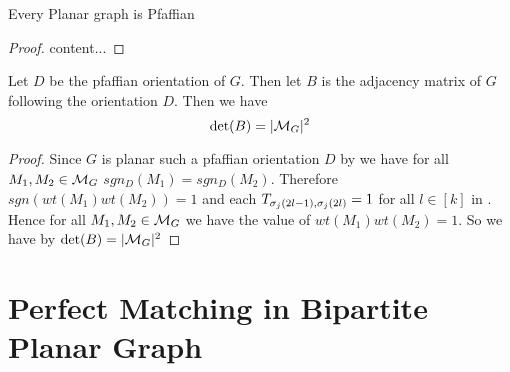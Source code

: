 \begin{theorem}
	Every Planar graph is Pfaffian 
\end{theorem}
\begin{proof}
	content...
\end{proof}
\begin{theorem}
	Let $D$ be the pfaffian orientation of $G$. Then let $B$ is the adjacency matrix of $G$ following the orientation $D$. Then we have $$\det(B)=|\mathcal{M}_G|^2$$
\end{theorem}
\begin{proof}
	Since $G$ is planar such a pfaffian orientation $D$ by  we have for all $M_1,M_2\in \mathcal{M}_G$ $sgn_D(M_1)=sgn_D(M_2)$. Therefore $sgn(wt(M_1)wt(M_2))=1$ and each $T_{\sigma_j(2l-1),\sigma_j(2l)}=1$ for all $l\in [k]$ in . Hence for all $M_1,M_2\in \mathcal{M}_G$ we have the value of $wt(M_1)wt(M_2)=1$. So we have by  $\det(B)=|\mathcal{M}_G|^2$
\end{proof}


\section{Perfect Matching in Bipartite Planar Graph}

